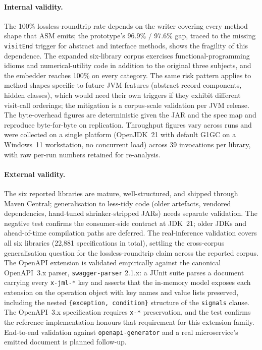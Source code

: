 \paragraph{Internal validity.}
The 100\% lossless-roundtrip rate depends on the writer covering every method
shape that ASM emits; the prototype's 96.9\% / 97.6\% gap, traced to the missing
\texttt{visitEnd} trigger for abstract and interface methods, shows the fragility
of this dependence. The expanded six-library corpus exercises
functional-programming idioms and numerical-utility code in addition to the
original three subjects, and the embedder reaches 100\% on every category. The
same risk pattern applies to method shapes specific to future JVM features
(abstract record components, hidden classes), which would need their own triggers
if they exhibit different visit-call orderings; the mitigation is a corpus-scale
validation per JVM release. The byte-overhead figures are deterministic given the
JAR and the spec map and reproduce byte-for-byte on replication. Throughput
figures vary across runs and were collected on a single platform (OpenJDK~21 with
default G1GC on a Windows~11 workstation, no concurrent load) across 39
invocations per library, with raw per-run numbers retained for re-analysis.

\paragraph{External validity.}
The six reported libraries are mature, well-structured, and shipped through Maven
Central; generalisation to less-tidy code (older artefacts, vendored
dependencies, hand-tuned shrinker-stripped JARs) needs separate validation. The
negative test confirms the consumer-side contract at JDK~21; older JDKs and
ahead-of-time compilation paths are deferred. The real-inference validation
covers all six libraries (22{,}881 specifications in total), settling the
cross-corpus generalisation question for the lossless-roundtrip claim across the
reported corpus. The OpenAPI extension is validated empirically against the
canonical OpenAPI~3.x parser, \texttt{swagger-parser} 2.1.x: a JUnit suite parses
a document carrying every \texttt{x-jml-*} key and asserts that the in-memory
model exposes each extension on the operation object with key names and value
lists preserved, including the nested \texttt{\{exception, condition\}} structure
of the \texttt{signals} clause. The OpenAPI~3.x specification requires
\texttt{x-*} preservation, and the test confirms the reference implementation
honours that requirement for this extension family. End-to-end validation against
\texttt{openapi-generator} and a real microservice's emitted document is planned
follow-up.

